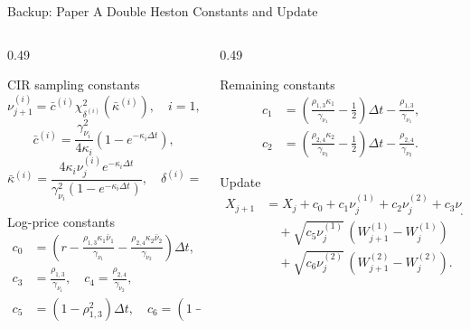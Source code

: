 \begin{frame}{Backup: Paper A Double Heston Constants and Update}
  \begin{columns}[T,onlytextwidth]
    \begin{column}{0.49\textwidth}
      \begin{block}{CIR sampling constants}
        {\tiny
        \[
        \nu_{j+1}^{(i)}=\bar c^{(i)}\chi^2_{\delta^{(i)}}(\bar\kappa^{(i)}),\quad i=1,2,
        \]
        \[
        \bar c^{(i)}=\frac{\gamma_{\nu_i}^2}{4\kappa_i}(1-e^{-\kappa_i\Delta t}),
        \]
        \[
        \bar\kappa^{(i)}=\frac{4\kappa_i\nu_j^{(i)}e^{-\kappa_i\Delta t}}{\gamma_{\nu_i}^2(1-e^{-\kappa_i\Delta t})},
        \quad
        \delta^{(i)}=\frac{4\kappa_i\bar\nu_i}{\gamma_{\nu_i}^2}.
        \]}
      \end{block}
      \begin{block}{Log-price constants}
        {\tiny
        \[
        \begin{aligned}
        c_0&=\left(r-\frac{\rho_{1,3}\kappa_1\bar\nu_1}{\gamma_{\nu_1}}-\frac{\rho_{2,4}\kappa_2\bar\nu_2}{\gamma_{\nu_2}}\right)\Delta t,\\
        c_3&=\frac{\rho_{1,3}}{\gamma_{\nu_1}},\quad c_4=\frac{\rho_{2,4}}{\gamma_{\nu_2}},\\
        c_5&=(1-\rho_{1,3}^2)\Delta t,
        \quad c_6=(1-\rho_{2,4}^2)\Delta t .
        \end{aligned}
        \]}
      \end{block}
    \end{column}
    \begin{column}{0.49\textwidth}
      \begin{block}{Remaining constants}
        {\tiny
        \[
        \begin{aligned}
        c_1&=\left(\frac{\rho_{1,3}\kappa_1}{\gamma_{\nu_1}}-\frac12\right)\Delta t-\frac{\rho_{1,3}}{\gamma_{\nu_1}},\\
        c_2&=\left(\frac{\rho_{2,4}\kappa_2}{\gamma_{\nu_2}}-\frac12\right)\Delta t-\frac{\rho_{2,4}}{\gamma_{\nu_2}} .
        \end{aligned}
        \]}
      \end{block}
      \begin{block}{Update}
        {\tiny
        \[
        \begin{aligned}
        X_{j+1}&=X_j+c_0+c_1\nu_j^{(1)}+c_2\nu_j^{(2)}+c_3\nu_{j+1}^{(1)}+c_4\nu_{j+1}^{(2)}\\
        &\quad+\sqrt{c_5\nu_j^{(1)}}\,(W_{j+1}^{(1)}-W_j^{(1)})\\
        &\quad+\sqrt{c_6\nu_j^{(2)}}\,(W_{j+1}^{(2)}-W_j^{(2)}).
        \end{aligned}
        \]}
      \end{block}
    \end{column}
  \end{columns}
\end{frame}

